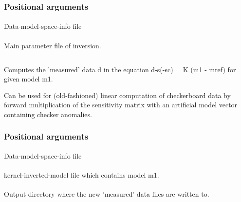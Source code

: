 \subsubsection{Positional arguments}
\paragraph{}
Data-model-space-info file
\paragraph{}
Main parameter file of inversion.
%
%
\subsection{} \label{programs_scripts,sec:bin_prog,sec:comp_data_kernel_sys}
Computes the 'measured' data d in the equation  d-s(-sc) = K (m1 - mref)  for given model m1.

Can be used for (old-fashioned) linear computation of checkerboard data by forward multiplication of the sensitivity 
matrix with an artificial model vector containing checker anomalies.
\subsubsection{Positional arguments}
\paragraph{}
Data-model-space-info file
\paragraph{}
kernel-inverted-model file which contains model m1.            
\paragraph{}
Output directory where the new 'measured' data files are written to.
